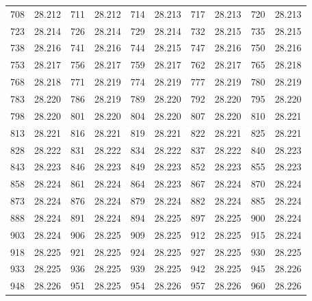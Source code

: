 \documentclass[12pt]{ctexart}
\numberwithin{equation}{section}
\begin{document}
\begin{longtable}{cc|cc|cc|cc|cc}
    708      & 28.212   & 711      & 28.212   & 714      & 28.213   & 717      & 28.213   & 720      & 28.213   \\
    723      & 28.214   & 726      & 28.214   & 729      & 28.214   & 732      & 28.215   & 735      & 28.215   \\
    738      & 28.216   & 741      & 28.216   & 744      & 28.215   & 747      & 28.216   & 750      & 28.216   \\
    753      & 28.217   & 756      & 28.217   & 759      & 28.217   & 762      & 28.217   & 765      & 28.218   \\
    768      & 28.218   & 771      & 28.219   & 774      & 28.219   & 777      & 28.219   & 780      & 28.219   \\
    783      & 28.220   & 786      & 28.219   & 789      & 28.220   & 792      & 28.220   & 795      & 28.220   \\
    798      & 28.220   & 801      & 28.220   & 804      & 28.220   & 807      & 28.220   & 810      & 28.221   \\
    813      & 28.221   & 816      & 28.221   & 819      & 28.221   & 822      & 28.221   & 825      & 28.221   \\
    828      & 28.222   & 831      & 28.222   & 834      & 28.222   & 837      & 28.222   & 840      & 28.223   \\
    843      & 28.223   & 846      & 28.223   & 849      & 28.223   & 852      & 28.223   & 855      & 28.223   \\
    858      & 28.224   & 861      & 28.224   & 864      & 28.223   & 867      & 28.224   & 870      & 28.224   \\
    873      & 28.224   & 876      & 28.224   & 879      & 28.224   & 882      & 28.224   & 885      & 28.224   \\
    888      & 28.224   & 891      & 28.224   & 894      & 28.225   & 897      & 28.225   & 900      & 28.224   \\
    903      & 28.224   & 906      & 28.225   & 909      & 28.225   & 912      & 28.225   & 915      & 28.224   \\
    918      & 28.225   & 921      & 28.225   & 924      & 28.225   & 927      & 28.225   & 930      & 28.225   \\
    933      & 28.225   & 936      & 28.225   & 939      & 28.225   & 942      & 28.225   & 945      & 28.226   \\
    948      & 28.226   & 951      & 28.225   & 954      & 28.226   & 957      & 28.226   & 960      & 28.226   \\

\end{longtable}
\end{document}
